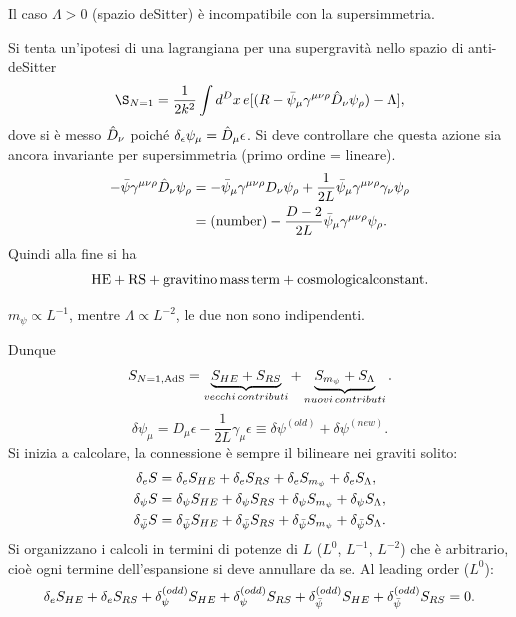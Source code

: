 \begin{obs}
    Il caso $\Lambda > 0$ (spazio deSitter) è incompatibile con la supersimmetria. 
\end{obs}
Si tenta un'ipotesi di una lagrangiana per una  supergravità nello spazio di anti-deSitter 
\begin{equation}
    \S_{N = 1} = \frac{1}{2k^2}\int d^Dx\,e[(R - \b{\psi}_\mu \gamma^{\mu\nu\rho}\h{D}_\nu\psi_\rho) - \Lambda],
\end{equation}
dove si è messo $\hat{D}_\nu$ poiché $\delta_\epsilon\psi_\mu = \hat{D}_\mu\epsilon$. Si deve controllare che questa azione sia ancora invariante per supersimmetria (primo ordine = lineare). 
\begin{equation}
    \begin{split}
        -\bar{\psi}\gamma^{\mu\nu\rho}\hat{D}_\nu\psi_\rho &= -\bar{\psi}_\mu\gamma^{\mu\nu\rho}D_\nu\psi_\rho + \frac{1}{2L}\bar{\psi}_\mu\gamma^{\mu\nu\rho}\gamma_\nu\psi_\rho \\
        &= (\mathrm{number}) - \frac{D - 2}{2L}\bar{\psi}_\mu\gamma^{\mu\nu\rho}\psi_\rho.
    \end{split}
\end{equation}
Quindi alla fine si ha 
\begin{equation}
    \mathrm{HE} + \mathrm{RS} + \mathrm{gravitino\,mass\,term} + \mathrm{cosmological constant}.
\end{equation}
\begin{obs}
    $m_\psi \propto L^{-1}$, mentre $\Lambda \propto L^{-2}$, le due non sono indipendenti.
\end{obs}
Dunque 
\begin{equation}
    S_{N = 1,\mathrm{AdS}} = \underbrace{S_{HE} + S_{RS}}_{vecchi\,contributi} + \underbrace{S_{m_\psi} + S_{\Lambda}}_{nuovi\,contributi}.
\end{equation}
\begin{equation}
    \delta\psi_\mu = D_\mu\epsilon - \frac{1}{2L}\gamma_\mu \epsilon \equiv \delta\psi^{(old)} + \delta\psi^{(new)}.
\end{equation}
Si inizia a calcolare, la connessione è sempre il bilineare nei graviti solito:
\begin{align}
    \delta_e S &= \delta_e S_{HE} + \delta_e S_{RS} + \delta_e S_{m_\psi} + \delta_e S_\Lambda, \\
    \delta_\psi S &= \delta_\psi S_{HE} + \delta_\psi S_{RS} + \delta_\psi S_{m_\psi} + \delta_\psi S_\Lambda, \\
    \delta_{\bar{\psi}} S &= \delta_{\bar{\psi}} S_{HE} + \delta_{\bar{\psi}} S_{RS} + \delta_{\bar{\psi}} S_{m_\psi} + \delta_{\bar{\psi}} S_\Lambda.
\end{align}
Si organizzano i calcoli in termini di potenze di $L$ ($L^0$, $L^{-1}$, $L^{-2}$) che è arbitrario, cioè ogni termine dell'espansione si deve annullare da se. Al leading order ($L^0$):
\begin{equation}
    \delta_e S_{HE} + \delta_e S_{RS} + \delta_\psi^{(odd)} S_{HE} + \delta_\psi^{(odd)} S_{RS} + \delta_{\bar{\psi}}^{(odd)} S_{HE} + \delta_{\bar{\psi}}^{(odd)} S_{RS} = 0.
\end{equation}

